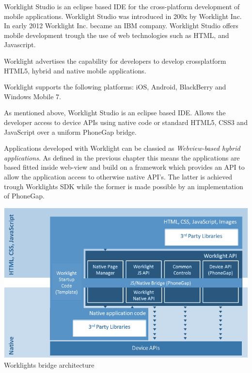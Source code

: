 \newpage

Worklight Studio is an eclipse based IDE for the cross-platform development of mobile applications. Worklight Studio was introduced in 200x by Worklight Inc. In early 2012 Worklight Inc. became an IBM company. Worklight Studio offers mobile development trough the use of web technologies such as HTML, and Javascript.

Worklight advertises the capability for developers to develop crossplatform HTML5, hybrid and native mobile applications.


Worklight supports the following platforms: iOS, Android, BlackBerry and Windows Mobile 7.

As mentioned above, Worklight Studio is an eclipse based IDE.
Allows the developer access to device APIs using native code or standard HTML5, CSS3 and JavaScript over a uniform PhoneGap bridge.


Applications developed with Worklight can be classied as \emph{Webview-based hybrid applications}. As defined in the previous chapter this means the applications are based fitted inside web-view and build on a framework which provides an API to allow the application access to otherwise native API's. The latter is achieved trough Worklights SDK while the former is made possible by an implementation of PhoneGap. \cite{Inc2012}

\begin{centering}
  \includegraphics[scale=0.5]{images/Worklight_architecture.png}\\{Worklights bridge architecture\cite{Inc2012a}}\\
\end{centering}

